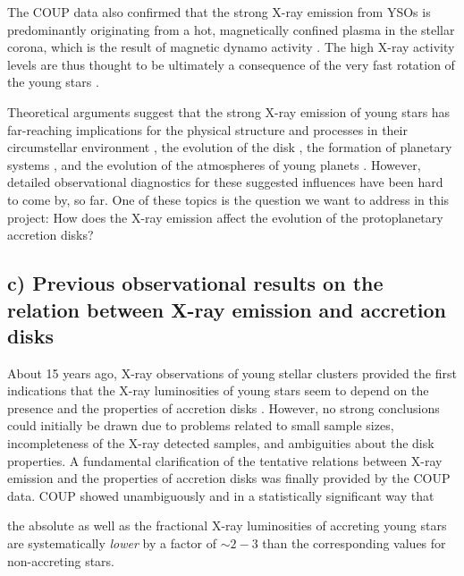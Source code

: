 \documentclass[10pt,fleqn,twoside,a4paper]{article}
\begin{document}
The COUP data also confirmed 
that the strong X-ray emission from YSOs  is predominantly originating from
 a hot, magnetically confined plasma in the stellar corona, which is the result of magnetic
dynamo activity \citep{Preibisch_coup_orig}. 
The high X-ray activity levels are thus thought to be ultimately a consequence of
the very fast rotation of the young stars \citep[e.g.,][]{AP12}.

Theoretical arguments suggest that 
the strong X-ray emission of young stars  has far-reaching implications
for the physical structure and processes in their circumstellar environment 
\citep[e.g.,][]{Glassgold05,Wolk05,EG13}, 
the evolution of the disk \citep[e.g.,][]{Ercolano14}, the
formation of planetary systems \citep[e.g.][]{ER15}, and the evolution of 
the atmospheres of young planets \citep[e.g.,][]{Johnstone15}.
However, detailed observational diagnostics for these suggested influences
 have been hard to come by, so far.
One of these topics is the
question we want to address in this project: How does the X-ray emission
affect the evolution of the protoplanetary accretion disks?




\subsection*{c) Previous observational results on the relation between 
X-ray emission and accretion disks}

About 15 years ago, 
X-ray observations of young stellar clusters provided the first indications that
the X-ray luminosities of young stars seem to depend on the presence
and the properties of accretion disks \citep[e.g.][]{Stelzer01}.
However, no strong conclusions
could initially be drawn due to problems related to small sample sizes, incompleteness of the
 X-ray detected samples, and ambiguities about the disk properties.
%
A fundamental clarification of the tentative relations between X-ray emission and
the properties of accretion disks was finally provided by the COUP data.
COUP showed unambiguously
and in a statistically significant way
that 
\begin{highlight}
the  absolute as well as the fractional X-ray luminosities
of accreting young stars are systematically {\em lower} by a factor of
 $\sim 2-3$ than the corresponding values for  non-accreting stars.
\end{highlight}
%
\end{document}
